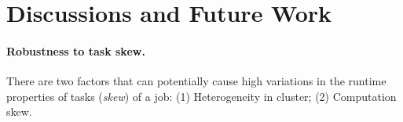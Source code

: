 \section{Discussions and Future Work}
\label{sec:discuss}


\paragraph{Robustness to task skew.} There are two factors
that can potentially cause high variations in the runtime properties
of tasks (\textit{skew}) of a job: (1) Heterogeneity in cluster; (2)
Computation skew.
